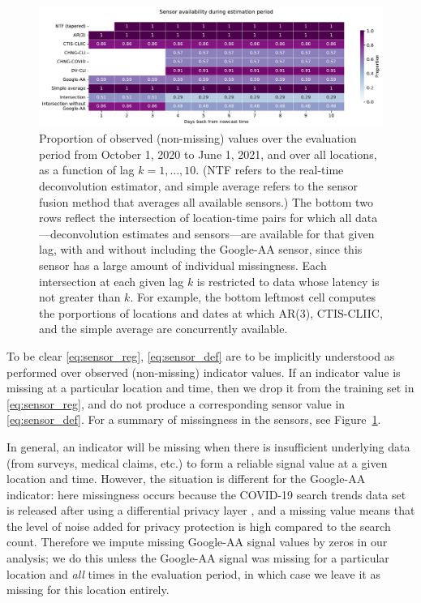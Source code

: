\documentclass[sts]{imsart}
\theoremstyle{plain}
\theoremstyle{definition}
\theoremstyle{remark}
\begin{document}
\begin{figure}[tb]
\centering
\includegraphics[width=0.9\linewidth]{./figures/availability.pdf}
\caption{Proportion of observed (non-missing) values over the evaluation 
  period from October 1, 2020 to June 1, 2021, and over all locations, as a 
  function of lag $k=1,\ldots,10$. (NTF refers to the real-time deconvolution
  estimator, and simple average refers to the sensor fusion method that 
  averages all available sensors.) The bottom two rows reflect the
  intersection of location-time pairs for which all data---deconvolution 
  estimates and sensors---are available for that given lag, with and
  without including the Google-AA sensor, since this sensor has a large amount
  of individual missingness. Each intersection at each given lag $k$ is restricted
  to data whose latency is not greater than $k$. For example, the bottom
  leftmost cell computes the porportions of locations and dates at which AR(3), 
  CTIS-CLIIC, and the simple average are concurrently available.} 
\label{fig:sensor_avail}
\end{figure}

To be clear \eqref{eq:sensor_reg}, \eqref{eq:sensor_def} are to be implicitly
understood as performed over observed (non-missing) indicator values. If an
indicator value is missing at a particular location and time, then we drop it
from the training set in \eqref{eq:sensor_reg}, and do not produce a
corresponding sensor value in \eqref{eq:sensor_def}. For a summary of
missingness in the sensors, see Figure~\ref{fig:sensor_avail}.

In general, an indicator will be missing when there is insufficient underlying
data (from surveys, medical claims, etc.) to form a reliable signal value at a
given location and time. However, the situation is different for the Google-AA
indicator: here missingness occurs because the COVID-19 search trends data set
is released after using a differential privacy layer \citep{Bavadekar:2020}, and
a missing value means that the level of noise added for privacy protection is
high compared to the search count. Therefore we impute missing Google-AA signal
values by zeros in our analysis; we do this unless the Google-AA signal was
missing for a particular location and \emph{all} times in the evaluation period,
in which case we leave it as missing for this location entirely.
\end{document}
